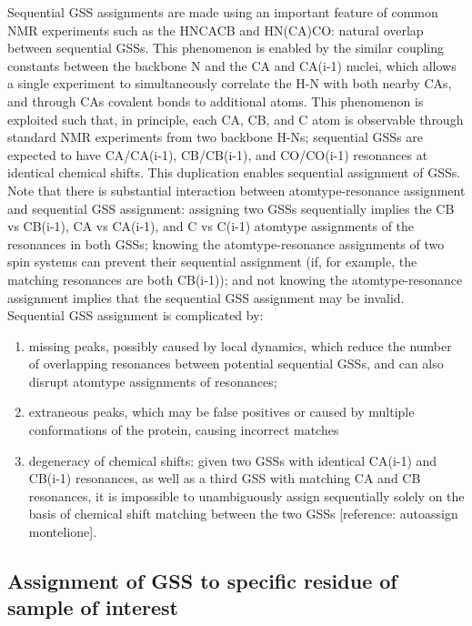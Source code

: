 Sequential GSS assignments are made using an important feature of common NMR 
experiments such as the HNCACB and HN(CA)CO: natural overlap between 
sequential GSSs.  This phenomenon is enabled by the similar coupling 
constants between the backbone N and the CA and CA(i-1) nuclei, which allows 
a single experiment to simultaneously correlate the H-N with both nearby CAs, 
and through CAs covalent bonds to additional atoms.  This phenomenon is 
exploited such that, in principle, each CA, CB, and C atom is observable 
through standard NMR experiments from two backbone H-Ns;  sequential GSSs 
are expected to have CA/CA(i-1), CB/CB(i-1), and CO/CO(i-1) resonances at 
identical chemical shifts.  This duplication enables sequential assignment 
of GSSs.  Note that there is substantial interaction between atomtype-resonance 
assignment and sequential GSS assignment: assigning two GSSs sequentially 
implies the CB vs CB(i-1), CA vs CA(i-1), and C vs C(i-1) atomtype assignments 
of the resonances in both GSSs; knowing the atomtype-resonance assignments of 
two spin systems can prevent their sequential assignment (if, for example, the 
matching resonances are both CB(i-1)); and not knowing the atomtype-resonance 
assignment implies that the sequential GSS assignment may be invalid.  
Sequential GSS assignment is complicated by: 
\begin{enumerate}
  \item missing peaks, possibly caused 
  by local dynamics, which reduce the number of overlapping resonances between 
  potential sequential GSSs, and can also disrupt atomtype assignments of 
  resonances; 
  \item extraneous peaks, which may be false positives or caused by 
  multiple conformations of the protein, causing incorrect matches
  \item degeneracy of chemical shifts:  given two GSSs with identical CA(i-1) 
  and CB(i-1) resonances, as well as a third GSS with matching CA and CB 
  resonances, it is impossible to unambiguously assign sequentially solely 
  on the basis of chemical shift   matching between the two GSSs 
  [reference: autoassign montelione].
\end{enumerate}

\subsection{Assignment of GSS to specific residue of sample of interest}

